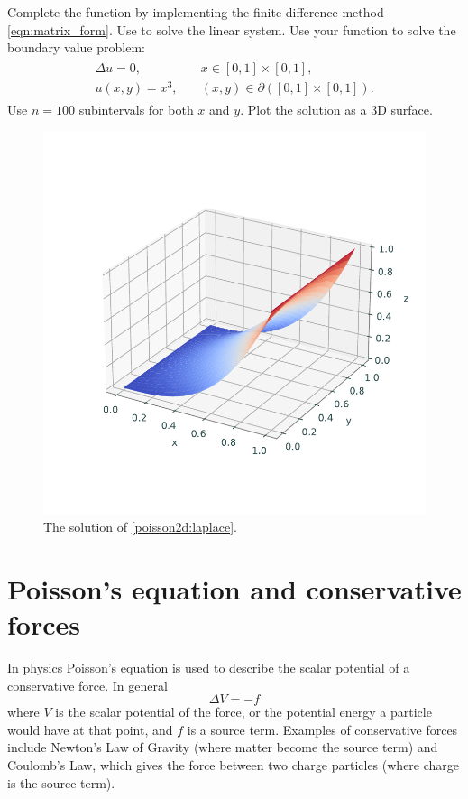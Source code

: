 \begin{problem}
Complete the function  by implementing the finite difference method \ref{eqn:matrix_form}. Use  to solve the linear system. Use your function to solve the boundary value problem:
\begin{align}
	\begin{split}
	\Delta u = 0, &{}\quad x \in [0,1]\times [0,1],\\
	u(x,y) = x^3, &{}\quad (x,y) \in \partial ([0,1]\times [0,1]).
	\end{split}
	\label{poisson2d:laplace}
\end{align}
Use $n=100$ subintervals for both $x$ and $y$. Plot the solution as a 3D surface.
\end{problem}

\begin{figure}
\includegraphics[width=\textwidth]{figures/poisson_square.pdf}
\caption{The solution of \eqref{poisson2d:laplace}.}
\end{figure}

\section*{Poisson's equation and conservative forces}
In physics Poisson's equation is used to describe the scalar potential of a conservative force.
In general
\[ \Delta V = - f\]
where $V$ is the scalar potential of the force, or the potential energy a particle would have at that point, and $f$ is a source term.
Examples of conservative forces include Newton's Law of Gravity (where matter become the source term) and Coulomb's Law, which gives the force between two charge particles (where charge is the source term).

